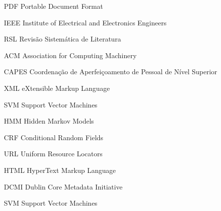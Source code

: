 
\begin{siglas}
  \item[PDF] Portable Document Format
  \item[IEEE] Institute of Electrical and Electronics Engineers
  \item[RSL] Revisão Sistemática de Literatura
  \item[ACM] Association for Computing Machinery
  \item[CAPES] Coordenação de Aperfeiçoamento de Pessoal de Nível Superior
  \item[XML] eXtensible Markup Language
  \item[SVM] Support Vector Machines
  \item[HMM] Hidden Markov Models
  \item[CRF] Conditional Random Fields
  \item[URL] Uniform Resource Locators
  \item[HTML] HyperText Markup Language
  \item[DCMI] Dublin Core Metadata Initiative
  \item[SVM] Support Vector Machines
\end{siglas}